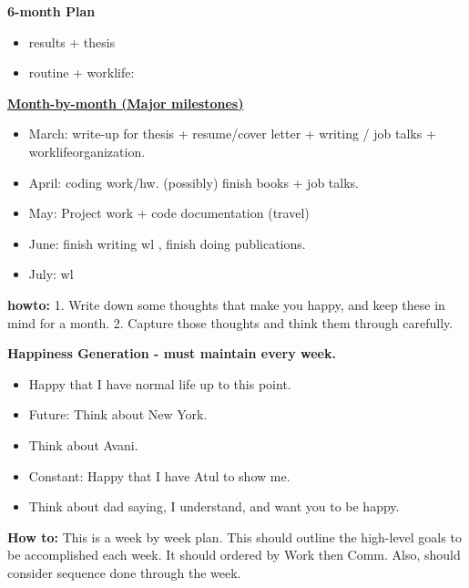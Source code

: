 \documentclass[11pt]{article}
\begin{document}
\textbf{6-month Plan} 
\begin{itemize} 
  \tiny \item \tiny results + thesis
\item \tiny routine + worklife:
\end{itemize}
\newpage
    {\small \underline{\textbf{Month-by-month (Major milestones)}}}\\
    \begin{itemize}
      \item \small March: write-up for thesis + resume/cover letter  +
         writing / job talks +    worklifeorganization. 
      \item \small April: coding work/hw. (possibly) finish books +
        job talks. 
      \item \small May: Project work + code documentation (travel)
      \item \small June: finish writing wl , finish doing
        publications. 
        \item \small July:  wl
    \end{itemize} 
\newpage 
\textbf{howto:} 1. Write down some thoughts that make you happy, and
keep these in mind for a month.  2. Capture those thoughts and think them through carefully. 

\textbf{Happiness Generation - must maintain every week.}
\begin{itemize}
  \tiny \item \tiny Happy that I have normal life up to this point.
  \item \tiny Future: Think about New York. 
  \item \tiny Think about Avani. 
  \item \tiny Constant: Happy that I have Atul to show me.
  \item \tiny Think about dad saying, I understand, and want you to be happy. 
\end{itemize} 

\newpage 
\textbf{How to:} This is a week by week plan. This should outline the
high-level goals to be accomplished each week. It should ordered by
Work then Comm. Also, should consider sequence done through the week.  \\
\end{document}
